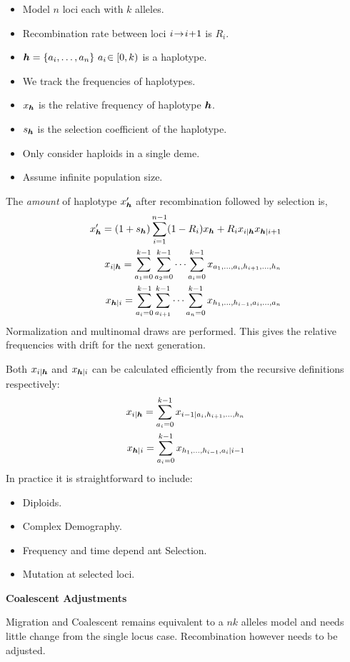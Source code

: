 \documentclass[portrait,final]{baposter}
\begin{document}
\begin{poster}
{\newcommand{\suck}{\hspace{-2pt}}
{\setlength{\leftmargini}{8.5pt}
\begin{itemize} 
  \item Model $n$ loci each with $k$ alleles. 
  \item Recombination rate between loci $i\suck \to\suck i\suck +\suck 1$ is
  $R_i$.
  \item $\bs{h}=\{a_i,\ldots,a_n\}\ a_i\suck \in [0,k)$ is a haplotype.
  \item We track the frequencies of haplotypes.
  \item $x_{\boldsymbol{h}}$ is the relative frequency of haplotype $\boldsymbol{h}$.
  \item $s_{\boldsymbol{h}}$ is the selection coefficient of the haplotype.  
  \item Only consider haploids in a single deme.
  \item Assume infinite population size. 
\end{itemize}}
\vspace{-2.5ex}
The \emph{amount} of haplotype $x'_{\boldsymbol{h}}$ after recombination followed by
selection is,
\vspace{-2ex}
\begin{align*}
	x'_{\boldsymbol{h}}=(1+s_{\boldsymbol{h}})\sum_{i=1}^{n-1}(1-R_i)x_{\boldsymbol{h}}+R_i
	x_{i|\boldsymbol{h}}x_{\boldsymbol{h}|i+1}
\\ 
	x_{i|\boldsymbol{h}}
	=\sum_{a_1=0}^{k-1}\sum_{a_2=0}^{k-1}\cdots\sum_{a_i=0}^{k-1}
	x_{a_1,\ldots,a_i,h_{i+1},\ldots,h_n}
\\
	x_{\boldsymbol{h}|i}=\sum_{a_i=0}^{k-1}\sum_{a_{i+1}}^{k-1}\cdots\sum_{a_n=0}^{k-1}
	x_{h_1,\ldots,h_{i-1},a_i,\ldots,a_n}
\end{align*}
Normalization and multinomal draws are performed. This gives the
relative frequencies with drift for the next generation. 

Both $x_{i|\boldsymbol{h}}$ and $x_{\boldsymbol{h}|i}$ can be calculated efficiently from
the recursive definitions respectively:
\vspace{-2ex}
\begin{align*}
	x_{i|\boldsymbol{h}}=\sum_{a_i=0}^{k-1} x_{i-1|a_i,h_{i+1},\ldots,h_{n}}
	\\
	x_{\boldsymbol{h}|i}=\sum_{a_i=0}^{k-1} x_{h_1,\ldots,h_{i-1},a_i|i-1}
\end{align*}
In practice it is straightforward to include:
\vspace{-2.5ex}
\begin{itemize}
  \item Diploids.
  \item Complex Demography.  
  \item Frequency and time depend ant Selection.
  \item Mutation at selected loci.
\end{itemize}
\vspace{-4.5ex}
\begin{center}
{\bfseries Coalescent Adjustments}
\end{center}
\vspace{-3ex}
Migration and Coalescent remains equivalent to a $nk$ alleles model and needs
little change from the single locus case. Recombination however needs to be
adjusted. 

}
\end{poster}
\end{document}
